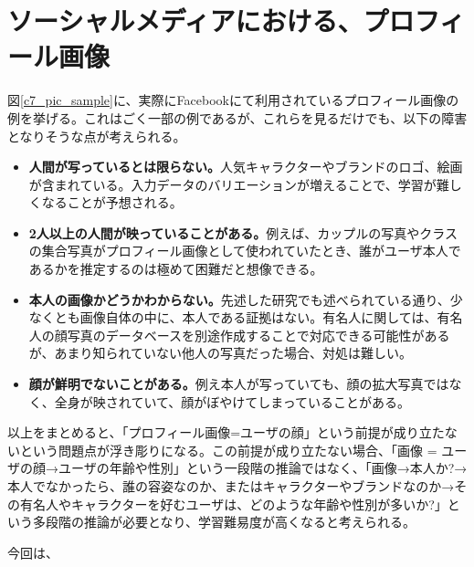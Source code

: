 \section{ソーシャルメディアにおける、プロフィール画像}
図\ref{c7_pic_sample}に、実際にFacebookにて利用されているプロフィール画像の例を挙げる。これはごく一部の例であるが、これらを見るだけでも、以下の障害となりそうな点が考えられる。
\begin{itemize}
\item \textbf{人間が写っているとは限らない。}人気キャラクターやブランドのロゴ、絵画が含まれている。入力データのバリエーションが増えることで、学習が難しくなることが予想される。
\item \textbf{2人以上の人間が映っていることがある。}例えば、カップルの写真やクラスの集合写真がプロフィール画像として使われていたとき、誰がユーザ本人であるかを推定するのは極めて困難だと想像できる。
\item \textbf{本人の画像かどうかわからない。}先述した研究\cite{pennacchiotti2011a-machine}でも述べられている通り、少なくとも画像自体の中に、本人である証拠はない。有名人に関しては、有名人の顔写真のデータベースを別途作成することで対応できる可能性があるが、あまり知られていない他人の写真だった場合、対処は難しい。
\item \textbf{顔が鮮明でないことがある。}例え本人が写っていても、顔の拡大写真ではなく、全身が映されていて、顔がぼやけてしまっていることがある。
\end{itemize}
以上をまとめると、「プロフィール画像=ユーザの顔」という前提が成り立たないという問題点が浮き彫りになる。この前提が成り立たない場合、「画像 = ユーザの顔→ユーザの年齢や性別」という一段階の推論ではなく、「画像→本人か?→本人でなかったら、誰の容姿なのか、またはキャラクターやブランドなのか→その有名人やキャラクターを好むユーザは、どのような年齢や性別が多いか?」という多段階の推論が必要となり、学習難易度が高くなると考えられる。\par
今回は、

